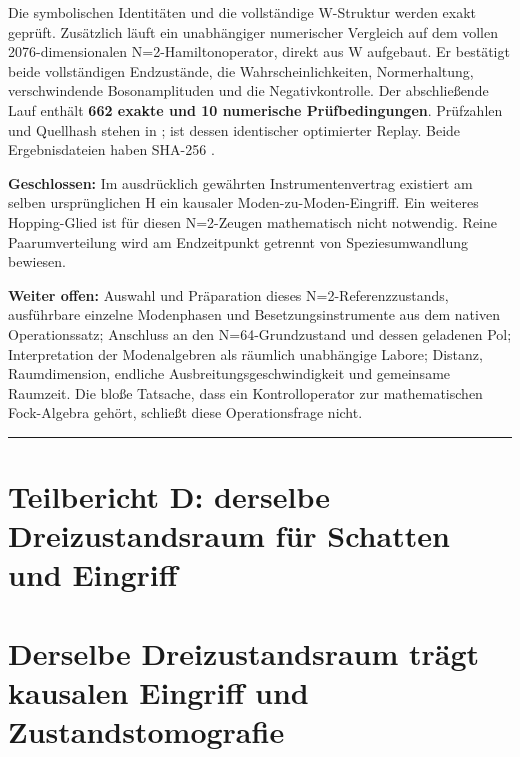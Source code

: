 Die symbolischen Identitäten und die vollständige W-Struktur werden
exakt geprüft. Zusätzlich läuft ein unabhängiger numerischer Vergleich
auf dem vollen 2076-dimensionalen N=2-Hamiltonoperator, direkt aus W
aufgebaut. Er bestätigt beide vollständigen Endzustände, die
Wahrscheinlichkeiten, Normerhaltung, verschwindende Bosonamplituden und
die Negativkontrolle. Der abschließende Lauf enthält \textbf{662 exakte
und 10 numerische Prüfbedingungen}. Prüfzahlen und Quellhash stehen in
;  ist dessen
identischer optimierter Replay. Beide Ergebnisdateien haben SHA-256
.

\textbf{Geschlossen:} Im ausdrücklich gewährten Instrumentenvertrag
existiert am selben ursprünglichen H ein kausaler
Moden-zu-Moden-Eingriff. Ein weiteres Hopping-Glied ist für diesen
N=2-Zeugen mathematisch nicht notwendig. Reine Paarumverteilung wird am
Endzeitpunkt getrennt von Speziesumwandlung bewiesen.

\textbf{Weiter offen:} Auswahl und Präparation dieses
N=2-Referenzzustands, ausführbare einzelne Modenphasen und
Besetzungsinstrumente aus dem nativen Operationssatz; Anschluss an den
N=64-Grundzustand und dessen geladenen Pol; Interpretation der
Modenalgebren als räumlich unabhängige Labore; Distanz, Raumdimension,
endliche Ausbreitungsgeschwindigkeit und gemeinsame Raumzeit. Die bloße
Tatsache, dass ein Kontrolloperator zur mathematischen Fock-Algebra
gehört, schließt diese Operationsfrage nicht.

\begin{center}\rule{0.5\linewidth}{0.5pt}\end{center}

\section{Teilbericht D: derselbe Dreizustandsraum für Schatten und
Eingriff}\label{teilbericht-d-derselbe-dreizustandsraum-fuxfcr-schatten-und-eingriff}

\section{Derselbe Dreizustandsraum trägt kausalen Eingriff und
Zustandstomografie}\label{derselbe-dreizustandsraum-truxe4gt-kausalen-eingriff-und-zustandstomografie}

